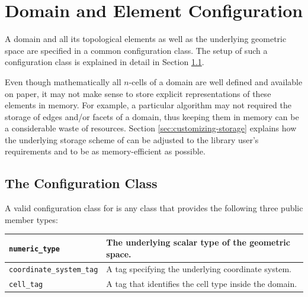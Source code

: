 \chapter{Domain and Element Configuration} \label{chap:domainconfig}

A domain and all its topological elements as well as the underlying geometric space are specified in a common configuration class.
The setup of such a configuration class is explained in detail in Section \ref{sec:config-class}.

Even though mathematically all $n$-cells of a domain are well defined and available on paper, it may not make sense to store explicit representations of these elements in memory.
For example, a particular algorithm may not required the storage of edges and/or facets of a domain, thus keeping them in memory can be a considerable waste of resources.
Section \ref{sec:customizing-storage} explains how the underlying storage scheme of {\ViennaGrid} can be adjusted to the library user's requirements and to be as memory-efficient as possible.


\section{The Configuration Class} \label{sec:config-class}
A valid configuration class for {\ViennaGrid} is any class that provides the following three public member types:
\begin{center}
\begin{tabular}{|l|p{8cm}|}
\hline
 \lstinline|numeric_type|   & The underlying scalar type of the geometric space. \\
\hline
 \lstinline|coordinate_system_tag| & A tag specifying the underlying coordinate system.\\
\hline
 \lstinline|cell_tag|       & A tag that identifies the cell type inside the domain.\\
\hline
\end{tabular}
\end{center}

